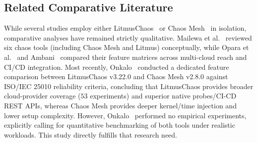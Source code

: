 \subsection{Related Comparative Literature}
While several studies employ either LitmusChaos~\cite{gurudu2026chaos, redkar2026enhancing} or Chaos Mesh~\cite{opara2025chaos, nigam2026aiaugmented} in isolation, comparative analyses have remained strictly qualitative. Mailewa et al.~\cite{mailewa2025review} reviewed six chaos tools (including Chaos Mesh and Litmus) conceptually, while Opara et al.~\cite{opara2025chaos} and Ambani~\cite{ambani2025systematic} compared their feature matrices across multi-cloud reach and CI/CD integration. Most recently, Onkalo~\cite{onkalo2025improving} conducted a dedicated feature comparison between LitmusChaos v3.22.0 and Chaos Mesh v2.8.0 against ISO/IEC 25010 reliability criteria, concluding that LitmusChaos provides broader cloud-provider coverage ($53$ experiments) and superior native probes/CI-CD REST APIs, whereas Chaos Mesh provides deeper kernel/time injection and lower setup complexity. However, Onkalo~\cite{onkalo2025improving} performed no empirical experiments, explicitly calling for quantitative benchmarking of both tools under realistic workloads. This study directly fulfills that research need.